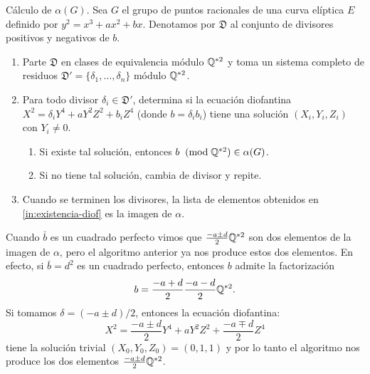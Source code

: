 \begin{alg}\label{alg:puntos-racionales}
Cálculo de $\alpha(G)$. Sea $G$ el grupo de puntos racionales de una curva elíptica $E$ definido por $y^2=x^3+ax^2+bx$. Denotamos por $\mathfrak{D}$ al conjunto de divisores positivos y negativos de $b$.
\begin{enumerate}
	\item Parte $\mathfrak{D}$ en clases de equivalencia módulo $\mathbb{Q}^{*2}$ y toma un sistema completo de residuos $\mathfrak{D}'=\{\delta_1,\ldots,\delta_n\}$ módulo $\mathbb{Q}^{*2}$.
	\item Para todo divisor $\delta_i\in\mathfrak{D}'$, determina si la ecuación diofantina $X^2=\delta_i Y^4+aY^2Z^2+b_i Z^4$ (donde $b=\delta_i b_i$) tiene una solución $(X_i,Y_i,Z_i)$ con $Y_i\neq0$.
	\begin{enumerate} 
		\item\label{in:existencia-diof} Si existe tal solución, entonces $b\;\;(\mathrm{mod}\; \mathbb{Q}^{*2})\in\alpha(G)$.
		\item Si no tiene tal solución, cambia de divisor y repite.
	\end{enumerate}
	\item Cuando se terminen los divisores, la lista de elementos obtenidos en \ref{in:existencia-diof} es la imagen de $\alpha$.
\end{enumerate}
\end{alg}

\begin{nota}
	Cuando $\bar{b}$ es un cuadrado perfecto vimos que $\frac{-a\pm d}{2}\mathbb{Q}^{*2}$ son dos elementos de la imagen de $\alpha$, pero el algoritmo anterior ya nos produce estos dos elementos. En efecto, si $\bar{b}=d^2$ es un cuadrado perfecto, entonces $b$ admite la factorización
	\[
		b=\frac{-a+d}{2}\frac{-a-d}{2}\mathbb{Q}^{*2}.
	\]
	Si tomamos $\delta=(-a\pm d)/2$, entonces la ecuación diofantina:
	\[
		X^2=\frac{-a\pm d}{2} Y^4+aY^2Z^2+\frac{-a\mp d}{2}Z^4
	\]
	tiene la solución trivial $(X_0,Y_0,Z_0)=(0,1,1)$ y por lo tanto el algoritmo nos produce los dos elementos $\frac{-a\pm d}{2}\mathbb{Q}^{*2}$.
\end{nota}


